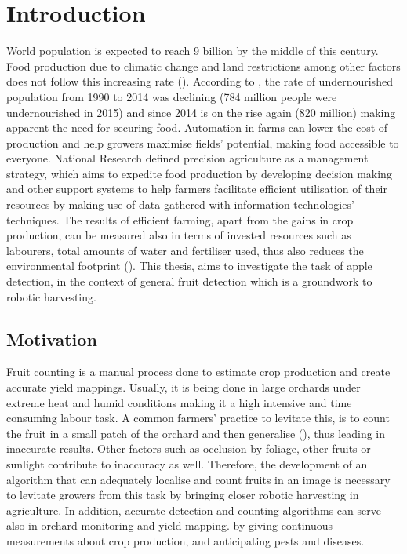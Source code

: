 \chapter{Introduction} \label{Chapter:Introduction}
World population is expected to reach 9 billion by the middle of this century. Food production due to climatic change and land restrictions among other factors does not follow this increasing rate (\cite{godfray2010food}). According to \cite{mcguire2015fao}, the rate of undernourished population from 1990 to 2014 was declining (784 million people were undernourished in 2015) and since 2014 is on the rise again (820 million) making apparent the need for securing food. Automation in farms can lower the cost of production and help growers maximise fields' potential, making food accessible to everyone. National Research \cite{NAP5491} defined precision agriculture as a management strategy, which aims to expedite food production by developing decision making and other support systems to help farmers facilitate efficient utilisation of their resources by making use of data gathered with information technologies' techniques. The results of efficient farming, apart from the gains in crop production, can be measured also in terms of invested resources such as labourers, total amounts of water and fertiliser used, thus also reduces the environmental footprint (\cite{zhang2012application}). This thesis, aims to investigate the task of apple detection, in the context of general fruit detection which is a groundwork to robotic harvesting.

\section{Motivation}
Fruit counting is a manual process done to estimate crop production and create accurate yield mappings. Usually, it is being done in large orchards under extreme heat and humid conditions making it a high intensive and time consuming labour task. A common farmers' practice to levitate this, is to count the fruit in a small patch of the orchard and then generalise (\cite{bargoti2017fruit}), thus leading in inaccurate results. Other factors such as occlusion by foliage, other fruits or sunlight contribute to inaccuracy as well. Therefore, the development of an algorithm that can adequately localise and count fruits in an image is necessary to levitate growers from this task by bringing closer robotic harvesting in agriculture. In addition, accurate detection and counting algorithms can serve also in orchard monitoring and yield mapping. by giving continuous measurements about crop production, and anticipating pests and diseases.

